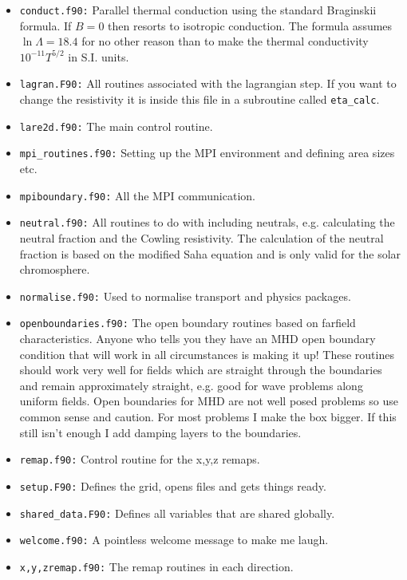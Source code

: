 \documentclass[11pt]{article}
\begin{document}
\begin{itemize}  
  \item{\texttt{conduct.f90:}} Parallel thermal conduction using the standard Braginskii formula. If $B=0$ then resorts to isotropic conduction. The formula assumes $\ln\Lambda=18.4$ for no other reason than to make the thermal conductivity $10^{-11}T^{5/2}$ in S.I. units.
  \item{\texttt{lagran.F90:}} All routines associated with the lagrangian step. If you want to change the resistivity it is inside this file in a subroutine called \texttt{eta\_calc}. 
  \item{\texttt{lare2d.f90:}} The main control routine.
  \item{\texttt{mpi\_routines.f90:}} Setting up the MPI environment and defining area sizes etc.
  \item{\texttt{mpiboundary.f90:}} All the MPI communication.
  \item{\texttt{neutral.f90:}} All routines to do with including neutrals, e.g. calculating the neutral fraction and the Cowling resistivity. The calculation of the neutral fraction is based on the modified Saha equation and is only valid for the solar chromosphere.
  \item{\texttt{normalise.f90:}} Used to normalise transport and physics packages. 
  \item{\texttt{openboundaries.f90:}} The open boundary routines based on farfield characteristics. Anyone who tells you they have an MHD open boundary condition that will work in all circumstances is making it up! These routines should work very well for fields which are straight through the boundaries and remain approximately straight, e.g. good for wave problems along uniform fields. Open boundaries for MHD are not well posed problems so use common sense and caution. For most problems I make the box bigger. If this still isn't enough I add damping layers to the boundaries. 
  \item{\texttt{remap.f90:}} Control routine for the x,y,z remaps.
  \item{\texttt{setup.F90:}} Defines the grid, opens files and gets things ready.
  \item{\texttt{shared\_data.F90:}} Defines all variables that are shared globally. 
  \item{\texttt{welcome.f90:}} A pointless welcome message to make me laugh.
  \item{\texttt{x,y,zremap.f90:}} The remap routines in each direction.
\end{itemize} 
\end{document}
